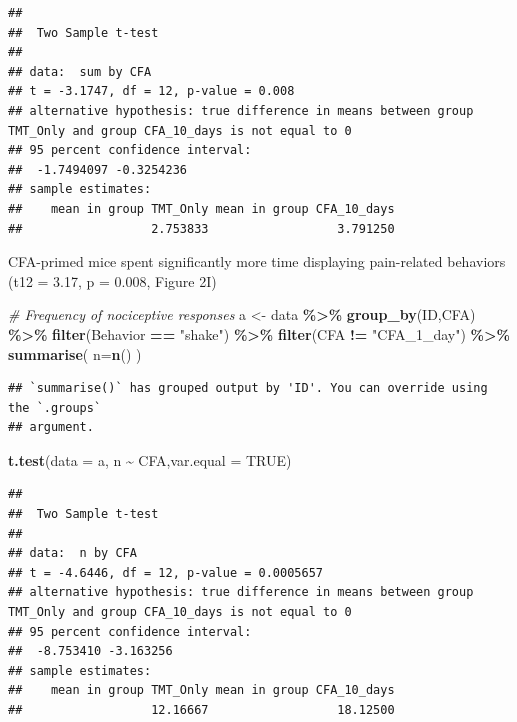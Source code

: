 \documentclass[
]{book}
\newenvironment{Shaded}{\begin{snugshade}}{\end{snugshade}}
\newcommand{\AttributeTok}[1]{\textcolor[rgb]{0.13,0.29,0.53}{#1}}
\newcommand{\CommentTok}[1]{\textcolor[rgb]{0.56,0.35,0.01}{\textit{#1}}}
\newcommand{\ConstantTok}[1]{\textcolor[rgb]{0.56,0.35,0.01}{#1}}
\newcommand{\FunctionTok}[1]{\textcolor[rgb]{0.13,0.29,0.53}{\textbf{#1}}}
\newcommand{\NormalTok}[1]{#1}
\newcommand{\OtherTok}[1]{\textcolor[rgb]{0.56,0.35,0.01}{#1}}
\newcommand{\SpecialCharTok}[1]{\textcolor[rgb]{0.81,0.36,0.00}{\textbf{#1}}}
\newcommand{\StringTok}[1]{\textcolor[rgb]{0.31,0.60,0.02}{#1}}
\begin{document}
\begin{verbatim}
## 
##  Two Sample t-test
## 
## data:  sum by CFA
## t = -3.1747, df = 12, p-value = 0.008
## alternative hypothesis: true difference in means between group TMT_Only and group CFA_10_days is not equal to 0
## 95 percent confidence interval:
##  -1.7494097 -0.3254236
## sample estimates:
##    mean in group TMT_Only mean in group CFA_10_days 
##                  2.753833                  3.791250
\end{verbatim}

CFA-primed mice spent significantly more time displaying pain-related behaviors (t12 = 3.17, p = 0.008, Figure 2I)

\begin{Shaded}
\begin{Highlighting}[]
\CommentTok{\# Frequency of nociceptive responses}
\NormalTok{a }\OtherTok{\textless{}{-}}\NormalTok{ data }\SpecialCharTok{\%\textgreater{}\%}
  \FunctionTok{group\_by}\NormalTok{(ID,CFA) }\SpecialCharTok{\%\textgreater{}\%}
  \FunctionTok{filter}\NormalTok{(Behavior }\SpecialCharTok{==} \StringTok{"shake"}\NormalTok{) }\SpecialCharTok{\%\textgreater{}\%}
  \FunctionTok{filter}\NormalTok{(CFA }\SpecialCharTok{!=} \StringTok{"CFA\_1\_day"}\NormalTok{) }\SpecialCharTok{\%\textgreater{}\%}
  \FunctionTok{summarise}\NormalTok{(}
    \AttributeTok{n=}\FunctionTok{n}\NormalTok{()}
\NormalTok{  )}
\end{Highlighting}
\end{Shaded}

\begin{verbatim}
## `summarise()` has grouped output by 'ID'. You can override using the `.groups`
## argument.
\end{verbatim}

\begin{Shaded}
\begin{Highlighting}[]
\FunctionTok{t.test}\NormalTok{(}\AttributeTok{data =}\NormalTok{ a, n }\SpecialCharTok{\textasciitilde{}}\NormalTok{ CFA,}\AttributeTok{var.equal =} \ConstantTok{TRUE}\NormalTok{)}
\end{Highlighting}
\end{Shaded}

\begin{verbatim}
## 
##  Two Sample t-test
## 
## data:  n by CFA
## t = -4.6446, df = 12, p-value = 0.0005657
## alternative hypothesis: true difference in means between group TMT_Only and group CFA_10_days is not equal to 0
## 95 percent confidence interval:
##  -8.753410 -3.163256
## sample estimates:
##    mean in group TMT_Only mean in group CFA_10_days 
##                  12.16667                  18.12500
\end{verbatim}
\end{document}
